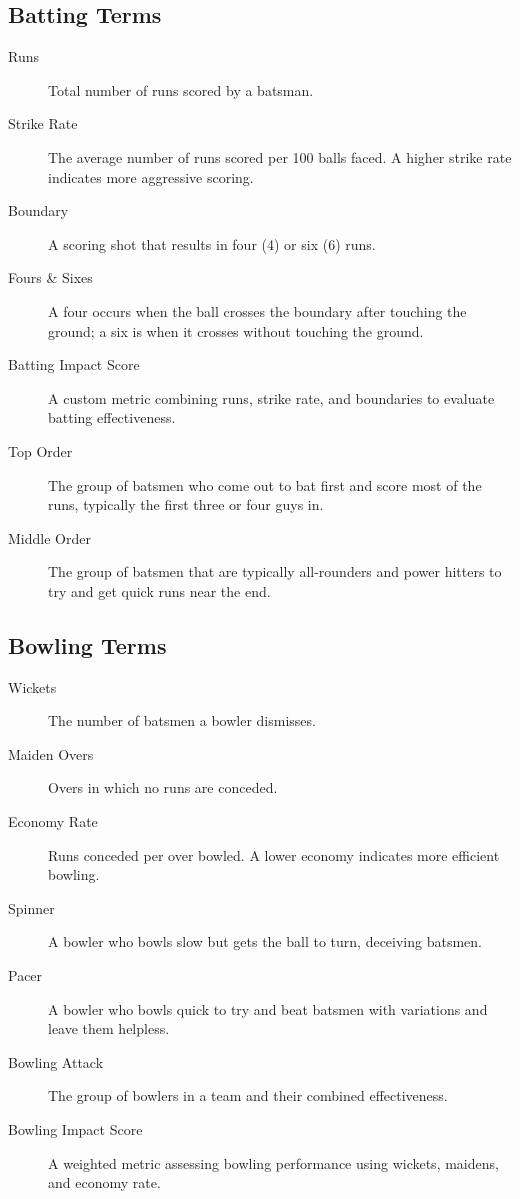 \documentclass{article}[12pt]
\begin{document}
\begin{appendices}
\subsection*{Batting Terms}
\begin{description}
  \item[Runs] Total number of runs scored by a batsman.
  \item[Strike Rate] The average number of runs scored per 100 balls faced. A higher strike rate indicates more aggressive scoring.
  \item[Boundary] A scoring shot that results in four (4) or six (6) runs.
  \item[Fours \& Sixes] A four occurs when the ball crosses the boundary after touching the ground; a six is when it crosses without touching the ground.
  \item[Batting Impact Score] A custom metric combining runs, strike rate, and boundaries to evaluate batting effectiveness.
  \item[Top Order] The group of batsmen who come out to bat first and score most of the runs, typically the first three or four guys in.
  \item[Middle Order] The group of batsmen that are typically all-rounders and power hitters to try and get quick runs near the end.
\end{description}

\subsection*{Bowling Terms}
\begin{description}
  \item[Wickets] The number of batsmen a bowler dismisses.
  \item[Maiden Overs] Overs in which no runs are conceded.
  \item[Economy Rate] Runs conceded per over bowled. A lower economy indicates more efficient bowling.
  \item[Spinner] A bowler who bowls slow but gets the ball to turn, deceiving batsmen.
  \item[Pacer] A bowler who bowls quick to try and beat batsmen with variations and leave them helpless.
  \item[Bowling Attack] The group of bowlers in a team and their combined effectiveness.
  \item[Bowling Impact Score] A weighted metric assessing bowling performance using wickets, maidens, and economy rate.
\end{description}


\end{appendices}
\end{document}
